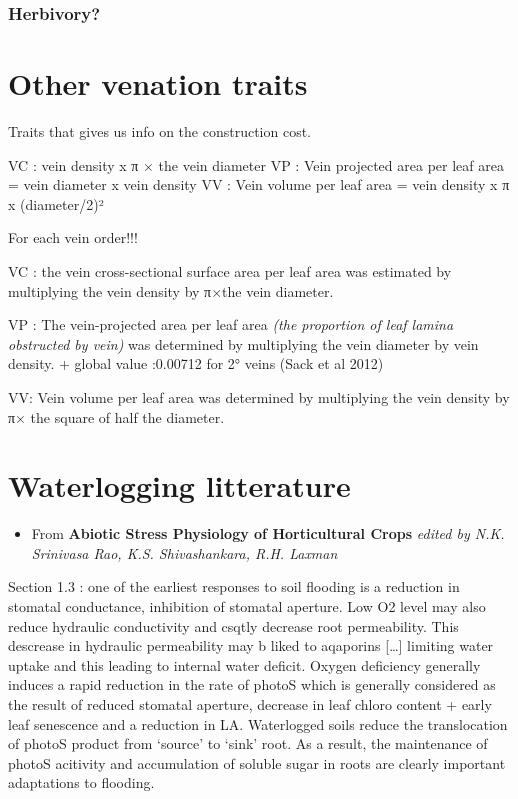 \documentclass[
]{book}
\providecommand{\tightlist}{%
  \setlength{\itemsep}{0pt}\setlength{\parskip}{0pt}}
\begin{document}
\hypertarget{herbivory}{%
\subsection{Herbivory?}\label{herbivory}}

\hypertarget{other-venation-traits}{%
\chapter{Other venation traits}\label{other-venation-traits}}

Traits that gives us info on the construction cost.

VC : vein density x π × the vein diameter
VP : Vein projected area per leaf area = vein diameter x vein density
VV : Vein volume per leaf area = vein density x π x (diameter/2)²

For each vein order!!!

VC : the vein cross-sectional surface area per leaf area was estimated by multiplying the vein density by π×the vein diameter.

VP : The vein-projected area per leaf area \emph{(the proportion of leaf lamina obstructed by vein)} was determined by multiplying the vein diameter by vein density.
+ global value :0.00712 for 2° veins (Sack et al 2012)

VV: Vein volume per leaf area was determined by multiplying the vein density by π× the square of half the diameter.

\hypertarget{waterlogging-litterature}{%
\chapter{Waterlogging litterature}\label{waterlogging-litterature}}

\begin{itemize}
\tightlist
\item
  From \textbf{Abiotic Stress Physiology of Horticultural Crops} \emph{edited by N.K. Srinivasa Rao, K.S. Shivashankara, R.H. Laxman}
\end{itemize}

Section 1.3 : one of the earliest responses to soil flooding is a reduction in stomatal conductance, inhibition of stomatal aperture. Low O2 level may also reduce hydraulic conductivity and csqtly decrease root permeability. This descrease in hydraulic permeability may b liked to aqaporins {[}\ldots{]} limiting water uptake and this leading to internal water deficit. Oxygen deficiency generally induces a rapid reduction in the rate of photoS which is generally considered as the result of reduced stomatal aperture, decrease in leaf chloro content + early leaf senescence and a reduction in LA. Waterlogged soils reduce the translocation of photoS product from `source' to `sink' root. As a result, the maintenance of photoS acitivity and accumulation of soluble sugar in roots are clearly important adaptations to flooding.
\end{document}
